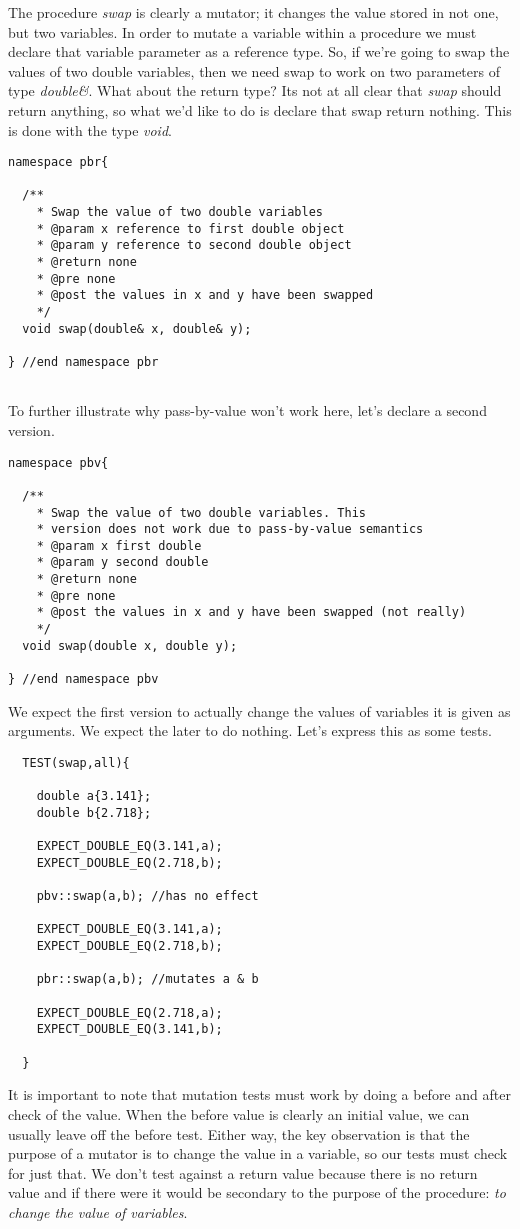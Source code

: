 \documentclass[]{tufte-handout}
\begin{document}
The procedure \textit{swap} is clearly a mutator; it changes the value stored in not one, but two variables. In order to mutate a variable within a procedure we must declare that variable parameter as a reference type. So, if we're going to swap the values of two double variables, then we need swap to work on two parameters of type \textit{double\&}. What about the return type? Its not at all clear that \textit{swap} should return anything, so what we'd like to do is declare that swap return nothing. This is done with the type \textit{void}.
\begin{verbatim}
namespace pbr{

  /**
    * Swap the value of two double variables
    * @param x reference to first double object
    * @param y reference to second double object 
    * @return none
    * @pre none
    * @post the values in x and y have been swapped
    */
  void swap(double& x, double& y);

} //end namespace pbr


\end{verbatim}
To further illustrate why pass-by-value won't work here, let's declare a second version.
\begin{verbatim}
namespace pbv{

  /**
    * Swap the value of two double variables. This
    * version does not work due to pass-by-value semantics
    * @param x first double
    * @param y second double
    * @return none
    * @pre none
    * @post the values in x and y have been swapped (not really)
    */
  void swap(double x, double y);

} //end namespace pbv
\end{verbatim}

We expect the first version to actually change the values of variables it is given as arguments. We expect the later to do nothing. Let's express this as some tests.
\begin{verbatim}
  TEST(swap,all){

    double a{3.141};
    double b{2.718};

    EXPECT_DOUBLE_EQ(3.141,a);
    EXPECT_DOUBLE_EQ(2.718,b);

    pbv::swap(a,b); //has no effect

    EXPECT_DOUBLE_EQ(3.141,a);
    EXPECT_DOUBLE_EQ(2.718,b);

    pbr::swap(a,b); //mutates a & b

    EXPECT_DOUBLE_EQ(2.718,a);
    EXPECT_DOUBLE_EQ(3.141,b);

  }
\end{verbatim}
It is important to note that mutation tests must work by doing a before and after check of the value.  When the before value is clearly an initial value, we can usually leave off the before test.  Either way, the key observation is that the purpose of a mutator is to change the value in a variable, so our tests must check for just that.  We don't test against a return value because there is no return value and if there were it would be secondary to the purpose of the procedure: \textit{to change the value of variables}.
\end{document}
